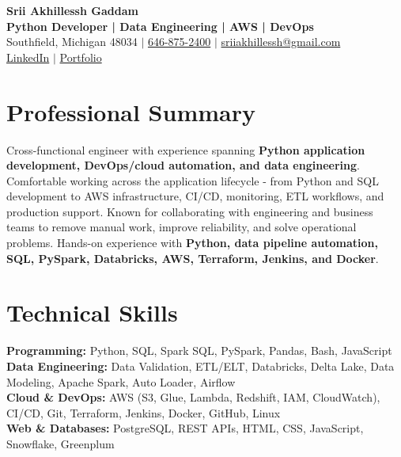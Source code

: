 \documentclass[letterpaper,10pt]{article}
\begin{document}
\fontsize{9.35pt}{10.45pt}\selectfont

\begin{center}
    {\LARGE \textbf{Srii Akhillessh Gaddam}} \\[-1pt]
    \textbf{Python Developer | Data Engineering | AWS | DevOps} \\[2pt]
    Southfield, Michigan 48034 $|$
    \href{tel:6468752400}{646-875-2400} $|$
    \href{mailto:sriiakhillessh@gmail.com}{sriiakhillessh@gmail.com} \\[1pt]
    \href{https://www.linkedin.com/in/srii-akhiilessh-gaddam-b48668191/}{LinkedIn} $|$
    \href{https://sriiakhillesshg.github.io/portfolio/}{Portfolio}
\end{center}
\vspace{-8pt}

\section{Professional Summary}
\small{Cross-functional engineer with experience spanning \textbf{Python application development, DevOps/cloud automation, and data engineering}. Comfortable working across the application lifecycle - from Python and SQL development to AWS infrastructure, CI/CD, monitoring, ETL workflows, and production support. Known for collaborating with engineering and business teams to remove manual work, improve reliability, and solve operational problems. Hands-on experience with \textbf{Python, data pipeline automation, SQL, PySpark, Databricks, AWS, Terraform, Jenkins, and Docker}.}

\section{Technical Skills}
\small{
\textbf{Programming:} Python, SQL, Spark SQL, PySpark, Pandas, Bash, JavaScript \\
\textbf{Data Engineering:} Data Validation, ETL/ELT, Databricks, Delta Lake, Data Modeling, Apache Spark, Auto Loader, Airflow \\
\textbf{Cloud \& DevOps:} AWS (S3, Glue, Lambda, Redshift, IAM, CloudWatch), CI/CD, Git, Terraform, Jenkins, Docker, GitHub, Linux \\
\textbf{Web \& Databases:} PostgreSQL, REST APIs, HTML, CSS, JavaScript, Snowflake, Greenplum
}
\end{document}
